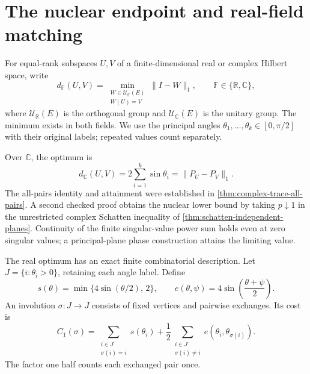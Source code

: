 \section{The nuclear endpoint and real-field matching}
\label{sec:nuclear-endpoint}

For equal-rank subspaces $U,V$ of a finite-dimensional real or complex
Hilbert space, write
\[
 d_{\mathbb F}(U,V)
   =\min_{\substack{W\in\mathcal U_{\mathbb F}(E)\\ W(U)=V}}
       \|I-W\|_1,
 \qquad \mathbb F\in\{\mathbb R,\mathbb C\},
\]
where $\mathcal U_{\mathbb R}(E)$ is the orthogonal group and
$\mathcal U_{\mathbb C}(E)$ is the unitary group. The minimum exists in
both fields. We use the principal angles
$\theta_1,\ldots,\theta_k\in[0,\pi/2]$ with their original labels;
repeated values count separately.

Over $\mathbb C$, the optimum is
\begin{equation}
 d_{\mathbb C}(U,V)=2\sum_{i=1}^k\sin\theta_i
                  =\|P_U-P_V\|_1.
 \label{eq:nuclear-complex-endpoint}
\end{equation}
The all-pairs identity and attainment were established in
\cref{thm:complex-trace-all-pairs}. A second checked proof obtains the
nuclear lower bound by taking $p\downarrow1$ in the unrestricted complex
Schatten inequality of \cref{thm:schatten-independent-planes}. Continuity
of the finite singular-value power sum holds even at zero singular values;
a principal-plane phase construction attains the limiting value.

The real optimum has an exact finite combinatorial description.
Let $J=\{i:\theta_i>0\}$, retaining each angle label. Define
\begin{equation}
 s(\theta)=\min\{4\sin(\theta/2),\,2\},\qquad
 e(\theta,\psi)=4\sin\!\left(\frac{\theta+\psi}{2}\right).
 \label{eq:nuclear-matching-weights}
\end{equation}
An involution $\sigma:J\to J$ consists of fixed vertices and
pairwise exchanges. Its cost is
\begin{equation}
 C_1(\sigma)=
 \sum_{\substack{i\in J\\\sigma(i)=i}}s(\theta_i)
 +\frac12\sum_{\substack{i\in J\\\sigma(i)\ne i}}
          e(\theta_i,\theta_{\sigma(i)}).
 \label{eq:nuclear-matching-cost}
\end{equation}
The factor one half counts each exchanged pair once.

